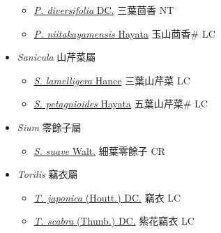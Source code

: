 \begin{itemize}
  \begin{itemize}
        \item[] \href{http://www.theplantlist.org/tpl1.1/search?q=Pimpinella+diversifolia}{\textit{P. diversifolia} DC.}   三葉茴香 NT
        \item[] \href{http://www.theplantlist.org/tpl1.1/search?q=Pimpinella+niitakayamensis}{\textit{P. niitakayamensis} Hayata}   玉山茴香\# LC
  \end{itemize}
 \item[] \textit{Sanicula} 山芹菜屬
                    
  \begin{itemize}
        \item[] \href{http://www.theplantlist.org/tpl1.1/search?q=Sanicula+lamelligera}{\textit{S. lamelligera} Hance}   三葉山芹菜 LC
        \item[] \href{http://www.theplantlist.org/tpl1.1/search?q=Sanicula+petagnioides}{\textit{S. petagnioides} Hayata}   五葉山芹菜\# LC
  \end{itemize}
 \item[] \textit{Sium} 零餘子屬
                    
  \begin{itemize}
        \item[] \href{http://www.theplantlist.org/tpl1.1/search?q=Sium+suave}{\textit{S. suave} Walt.}   細葉零餘子 CR
  \end{itemize}
 \item[] \textit{Torilis} 竊衣屬
                    
  \begin{itemize}
        \item[] \href{http://www.theplantlist.org/tpl1.1/search?q=Torilis+japonica}{\textit{T. japonica} (Houtt.) DC.}   竊衣 LC
        \item[] \href{http://www.theplantlist.org/tpl1.1/search?q=Torilis+scabra}{\textit{T. scabra} (Thunb.) DC.}   紫花竊衣 LC
  \end{itemize}
  \end{itemize}
